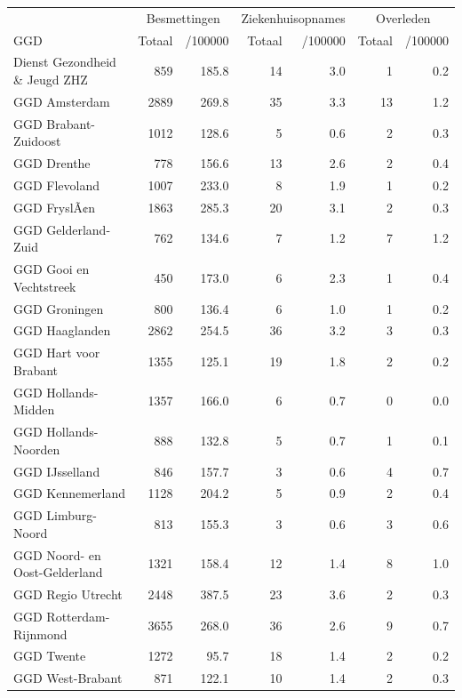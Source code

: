 \documentclass[
  english,
  man,floatsintext]{apa6}
\begin{document}
\begin{table}
\centering\begingroup\fontsize{10}{12}\selectfont

\begin{threeparttable}
\begin{tabular}{lrrrrrr}
\toprule
\multicolumn{1}{c}{ } & \multicolumn{2}{c}{Besmettingen} & \multicolumn{2}{c}{Ziekenhuisopnames} & \multicolumn{2}{c}{Overleden} \\
\cmidrule(l{3pt}r{3pt}){2-3} \cmidrule(l{3pt}r{3pt}){4-5} \cmidrule(l{3pt}r{3pt}){6-7}
GGD & Totaal & /100000 & Totaal & /100000 & Totaal & /100000\\
\midrule
Dienst Gezondheid \& Jeugd ZHZ & 859 & 185.8 & 14 & 3.0 & 1 & 0.2\\
GGD Amsterdam & 2889 & 269.8 & 35 & 3.3 & 13 & 1.2\\
GGD Brabant-Zuidoost & 1012 & 128.6 & 5 & 0.6 & 2 & 0.3\\
GGD Drenthe & 778 & 156.6 & 13 & 2.6 & 2 & 0.4\\
GGD Flevoland & 1007 & 233.0 & 8 & 1.9 & 1 & 0.2\\
GGD FryslÃ¢n & 1863 & 285.3 & 20 & 3.1 & 2 & 0.3\\
GGD Gelderland-Zuid & 762 & 134.6 & 7 & 1.2 & 7 & 1.2\\
GGD Gooi en Vechtstreek & 450 & 173.0 & 6 & 2.3 & 1 & 0.4\\
GGD Groningen & 800 & 136.4 & 6 & 1.0 & 1 & 0.2\\
GGD Haaglanden & 2862 & 254.5 & 36 & 3.2 & 3 & 0.3\\
GGD Hart voor Brabant & 1355 & 125.1 & 19 & 1.8 & 2 & 0.2\\
GGD Hollands-Midden & 1357 & 166.0 & 6 & 0.7 & 0 & 0.0\\
GGD Hollands-Noorden & 888 & 132.8 & 5 & 0.7 & 1 & 0.1\\
GGD IJsselland & 846 & 157.7 & 3 & 0.6 & 4 & 0.7\\
GGD Kennemerland & 1128 & 204.2 & 5 & 0.9 & 2 & 0.4\\
GGD Limburg-Noord & 813 & 155.3 & 3 & 0.6 & 3 & 0.6\\
GGD Noord- en Oost-Gelderland & 1321 & 158.4 & 12 & 1.4 & 8 & 1.0\\
GGD Regio Utrecht & 2448 & 387.5 & 23 & 3.6 & 2 & 0.3\\
GGD Rotterdam-Rijnmond & 3655 & 268.0 & 36 & 2.6 & 9 & 0.7\\
GGD Twente & 1272 & 95.7 & 18 & 1.4 & 2 & 0.2\\
GGD West-Brabant & 871 & 122.1 & 10 & 1.4 & 2 & 0.3\\

\end{tabular}
\end{threeparttable}
\end{table}
\end{document}
